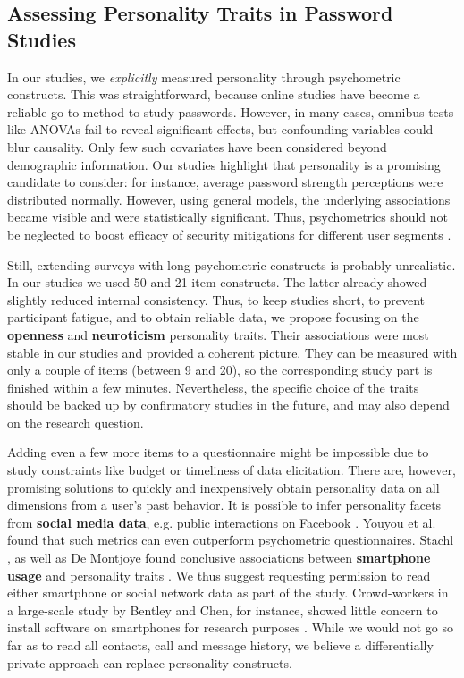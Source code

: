 \subsection{Assessing Personality Traits in Password Studies}
In our studies, we \textit{explicitly} measured personality through psychometric constructs. This was straightforward, because online studies have become a reliable go-to method to study passwords. However, in many cases, omnibus tests like ANOVAs fail to reveal significant effects, but confounding variables could blur causality. Only few such covariates have been considered beyond demographic information. Our studies highlight that personality is a promising candidate to consider: for instance, average password strength perceptions were distributed normally. However, using general models, the underlying associations became visible and were statistically significant. Thus, psychometrics should not be neglected to boost efficacy of security mitigations for different user segments \cite{Egelman2015AverageUser}. 

Still, extending surveys with long psychometric constructs is probably unrealistic. In our studies we used 50 and 21-item constructs. The latter already showed slightly reduced internal consistency. Thus, to keep studies short, to prevent participant fatigue, and to obtain reliable data, we propose focusing on the \textbf{openness} and \textbf{neuroticism} personality traits. Their associations were most stable in our studies and provided a coherent picture. They can be measured with only a couple of items (between 9 and 20), so the corresponding study part is finished within a few minutes. Nevertheless, the specific choice of the traits should be backed up by confirmatory studies in the future, and may also depend on the research question.

Adding even a few more items to a questionnaire might be impossible due to study constraints like budget or timeliness of data elicitation. There are, however, promising solutions to quickly and inexpensively obtain personality data on all dimensions from a user's past behavior. It is possible to infer personality facets from \textbf{social media data}, e.g. public interactions on Facebook \cite{Youyou2015Personality}. Youyou et al. found that such metrics can even outperform psychometric questionnaires. Stachl \etal, as well as De Montjoye \etal found conclusive associations between \textbf{smartphone usage} and personality traits \cite{DeMontjoye2013, Stachl2017PersonalitySmartphones}. We thus suggest requesting permission to read either smartphone or social network data as part of the study. Crowd-workers in a large-scale study by Bentley and Chen, for instance, showed little concern to install software on smartphones for research purposes \cite{Bentley2015Phonebook}. While we would not go so far as to read all contacts, call and message history, we believe a differentially private approach can replace personality constructs. 

